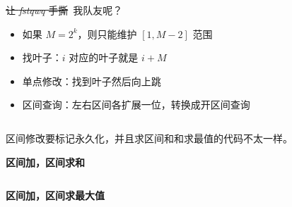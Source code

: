 \sout{让 \textit{fstqwq} 手撕}\ 我队友呢？

\begin{itemize}
	\item 如果 $M = 2^k$，则只能维护 $[1, M - 2]$ 范围
	\item 找叶子：$i$ 对应的叶子就是 $i + M$
	\item 单点修改：找到叶子然后向上跳
	\item 区间查询：左右区间各扩展一位，转换成开区间查询
	\inputminted{cpp}{../src/datastructure/非递归线段树单点修改.cpp}

\end{itemize}
	
区间修改要标记永久化，并且求区间和和求最值的代码不太一样。

\textbf{区间加，区间求和}
\inputminted{cpp}{../src/datastructure/非递归线段树区间加区间求和.cpp}

\textbf{区间加，区间求最大值}
\inputminted{cpp}{../src/datastructure/非递归线段树区间加区间求最大值.cpp}
